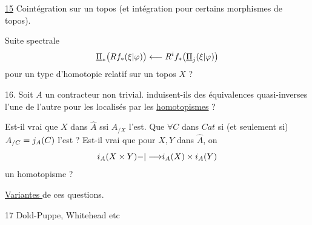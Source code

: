 \uline{15} Cointégration sur un topos (et intégration pour certains morphismes de topos).

Suite spectrale
\[
\underline\Pi_*\bigl(Rf_*({\xi|\varphi})\bigr)
\longleftarrow R^if_*\bigl(\underline\Pi_j({\xi|\varphi})\bigr)
\]
pour un type d'homotopie relatif sur un topos $X$ ?


16. Soit $A$ un contracteur non trivial. 
induisent-ils des équivalences quasi-inverses l'une de l'autre pour les localisés par les \uline{homotopismes} ?

Est-il vrai que $X$ dans $\widehat A$  ssi $A_{/X}$ l'est. Que $\forall C$ dans $Cat$  si (et seulement si) $A_{/C}{{}=j_A(C)}$ l'est ? Est-il vrai que pour $X,Y$ dans $\widehat A$, on
\[
i_A(X\times Y){\mathbin{-}|\longrightarrow}i_A(X)\times i_A(Y)
\]
un homotopisme ?

\uline{Variantes } de ces questions.


17 Dold-Puppe, Whitehead etc

